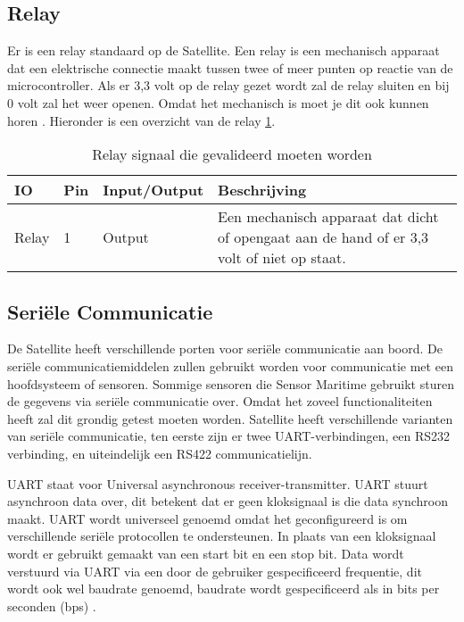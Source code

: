 \subsection{Relay}
Er is een relay standaard op de Satellite. Een relay is een mechanisch apparaat dat een elektrische connectie maakt tussen twee of meer punten op reactie van de microcontroller. Als er 3,3 volt op de relay gezet wordt zal de relay sluiten en bij 0 volt zal het weer openen. Omdat het mechanisch is moet je dit ook kunnen horen \autocite{relay}. Hieronder is een overzicht van de relay \ref{tab:hw_val_relay}.

\begin{table}[h!]
	\caption{Relay signaal die gevalideerd moeten worden}
	\begin{tabular}{lllp{12cm}}
	\toprule
	\textbf{IO} & \textbf{Pin} & \textbf{Input/Output} & \textbf{Beschrijving}			\\ \toprule
	Relay		& 1   	& Output		& Een mechanisch apparaat dat dicht of opengaat aan de hand of er 3,3 volt of niet op staat.	\\ \bottomrule
	\end{tabular}
	\label{tab:hw_val_relay}
\end{table}

\subsection{Seriële Communicatie}
De Satellite heeft verschillende porten voor seriële communicatie aan boord. De seriële communicatiemiddelen zullen gebruikt worden voor communicatie met een hoofdsysteem of sensoren. Sommige sensoren die Sensor Maritime gebruikt sturen de gegevens via seriële communicatie over. Omdat het zoveel functionaliteiten heeft zal dit grondig getest moeten worden. Satellite heeft verschillende varianten van seriële communicatie, ten eerste zijn er twee UART-verbindingen, een RS232 verbinding, en uiteindelijk een RS422 communicatielijn. \newline

\noindent UART staat voor Universal asynchronous receiver-transmitter. UART stuurt asynchroon data over, dit betekent dat er geen kloksignaal is die data synchroon maakt. UART wordt universeel genoemd omdat het geconfigureerd is om verschillende seriële protocollen te ondersteunen. In plaats van een kloksignaal wordt er gebruikt gemaakt van een start bit en een stop bit. Data wordt verstuurd via UART via een door de gebruiker gespecificeerd frequentie, dit wordt ook wel baudrate genoemd, baudrate wordt gespecificeerd als in bits per seconden (bps) \autocite{UART}. \newline

